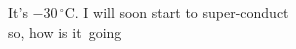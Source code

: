 \documentclass{article}
\begin{document}
It's $-30\,^{\circ}\mathrm{C}$.
I will soon start to
super-conduct\\
so, how is it\, going
\end{document}
